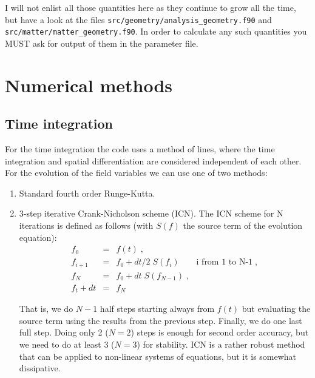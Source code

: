 \documentclass[12pt]{article}
\begin{document}
I will not enlist all those quantities here as they continue to grow
all the time, but have a look at the files
\texttt{src/geometry/analysis\_geometry.f90} and
\texttt{src/matter/matter\_geometry.f90}. In order to calculate any
such quantities you MUST ask for output of them in the parameter file.




\setcounter{equation}{0}
\section{Numerical methods}
\label{sec:numerics}

\subsection{Time integration}

For the time integration the code uses a method of lines, where the
time integration and spatial differentiation are considered
independent of each other. \\

For the evolution of the field variables we can use one of two
methods:

\begin{enumerate}

\item Standard fourth order Runge-Kutta.

\item 3-step iterative Crank-Nicholson scheme (ICN).  The ICN scheme for
N iterations is defined as follows (with $S(f)$ the source term of the
evolution equation):
\begin{eqnarray}
f_0  &=&  f(t) \; , \\
f_{i+1} &=&  f_0 + dt/2 \; S(f_i)  \qquad \textrm{i from 1 to N-1} \; , \\
f_N &=&  f_0 + dt \; S(f_{N-1}) \; , \\
f_t+dt &=& f_N
\end{eqnarray}

That is, we do $N-1$ half steps starting always from $f(t)$ but
evaluating the source term using the results from the previous step.
Finally, we do one last full step.  Doing only 2 ($N=2$) steps is
enough for second order accuracy, but we need to do at least 3 ($N=3$)
for stability.  ICN is a rather robust method that can be applied to
non-linear systems of equations, but it is somewhat dissipative.

\end{enumerate}
\end{document}
